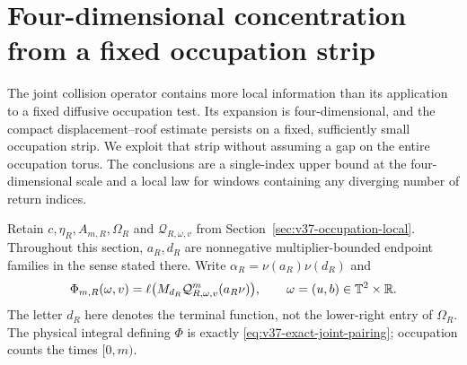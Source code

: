 \section{Four-dimensional concentration from a fixed occupation strip}
\label{sec:v38-four-dimensional-concentration}
The joint collision operator contains more local information than its
application to a fixed diffusive occupation test. Its expansion is
four-dimensional, and the compact displacement--roof estimate persists
on a fixed, sufficiently small occupation strip. We exploit that strip
without assuming a gap on the entire occupation torus. The conclusions
are a single-index upper bound at the four-dimensional scale and a
local law for windows containing any diverging number of return indices.

Retain $c,\eta_R,A_{m,R},\Omega_R$ and $\mathcal Q_{R,\omega,v}$ from
Section~\ref{sec:v37-occupation-local}. Throughout this section, $a_R,d_R$
are nonnegative multiplier-bounded endpoint families in the sense stated
there. Write $\alpha_R=\nu(a_R)\nu(d_R)$ and
\[
 \Phi_{m,R}(\omega,v)
 =\ell\bigl(M_{d_R}\mathcal Q_{R,\omega,v}^m(a_R\nu)\bigr),
 \qquad \omega=(u,b)\in\mathbb T^2\times\mathbb R.
\]
The letter $d_R$ here denotes the terminal function, not the lower-right
entry of $\Omega_R$. The physical integral defining $\Phi$ is exactly
\eqref{eq:v37-exact-joint-pairing}; occupation counts the times $[0,m)$.

